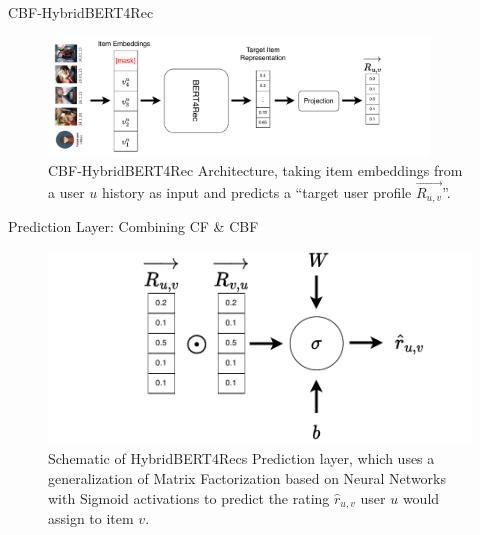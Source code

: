 \documentclass[en]{sdqbeamer}
\begin{document}
\begin{frame}{CBF-HybridBERT4Rec}
	\begin{figure}
		\includegraphics[width=0.9\textwidth]{images/CBF-HybridBERT4Rec.pdf}
		\caption{CBF-HybridBERT4Rec Architecture, taking item embeddings from a user $u$ history as input and predicts a \enquote{target user profile $\overrightarrow{R_{u,v}}$}. \cite{channarongHybridBERT4RecHybridContentBased2022}}
	\end{figure}
\end{frame}
\begin{frame}{Prediction Layer: Combining CF \& CBF}
	\begin{figure}
		\includegraphics[height=0.5\textheight]{images/Prediction_Layer.pdf}
		\caption{Schematic of HybridBERT4Recs Prediction layer, which uses a generalization of Matrix Factorization based on Neural Networks with Sigmoid activations to predict the rating $\hat{r}_{u,v}$ user $u$ would assign to item $v$. \cite{channarongHybridBERT4RecHybridContentBased2022}}
	\end{figure}
\end{frame}
\end{document}

